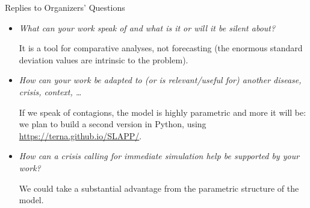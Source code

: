 \documentclass[8pt]{beamer}
\begin{document}
\begin{frame}{Replies to Organizers' Questions}

\begin{itemize}

\item \textit{What can your work speak of and what is it or will it be silent about?}

\bigskip
It is a tool for comparative analyses, not forecasting (the enormous standard deviation values are intrinsic to the problem).
\bigskip
        
        
\item \textit{How can your work be adapted to (or is relevant/useful for) another disease, crisis, context, \ldots}

\bigskip
If we speak of contagions, the model is highly parametric and more it will be: we plan to build a second version in Python, using 
\url{https://terna.github.io/SLAPP/}.

\bigskip
    
\item  \textit{How can a crisis calling for immediate simulation help be supported by your work?}

\bigskip
We could take a substantial advantage from the parametric structure of the model.
\bigskip

\end{itemize}
 

\end{frame}
\end{document}
